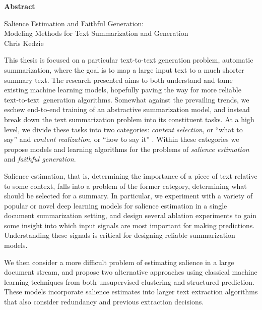 
\begin{titlepage}
\begin{center}

\textbf{\large Abstract}

Salience Estimation and Faithful Generation:\\
Modeling Methods for Text Summarization and Generation\\

Chris Kedzie
\end{center}

This thesis is focused on a particular text-to-text generation problem,
automatic summarization, where the goal is to map a large input text to a much
shorter summary text. The research presented aims to both understand and
tame existing machine learning models, hopefully paving the way for more
reliable text-to-text~generation algorithms.  Somewhat against the prevailing
trends, we eschew end-to-end training of an abstractive summarization model,
and instead break down the text summarization problem into its constituent
tasks.  At a high level, we divide these tasks into two categories:
\textit{content selection}, or ``what to say'' and \textit{content
realization}, or ``how to say it'' \citep{mckeown1985}.  Within these
categories we propose models and learning algorithms for the problems of 
\textit{salience estimation} and \textit{faithful generation}.

Salience estimation, that is, determining the importance of a piece of text
relative to some context, falls into a problem of the former category,
determining what should be selected for a summary.  In particular, we
experiment with a variety of popular or novel deep learning models for
salience estimation in a single document summarization setting, and design several ablation experiments to gain some
insight into which input signals are most important for making predictions.
Understanding these signals is critical for designing reliable summarization
models. 

We then consider a more difficult problem of estimating salience in a large
document stream, and propose two alternative approaches using classical
machine learning techniques from both unsupervised clustering and structured
prediction. These models incorporate salience estimates into larger text
extraction algorithms that also consider redundancy and previous extraction
decisions.


\end{titlepage}
